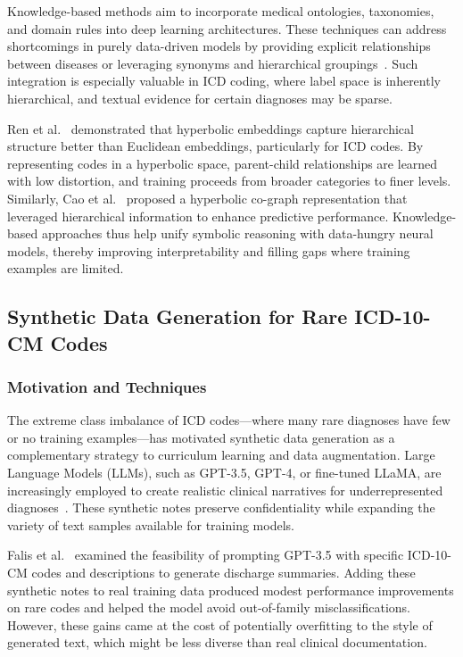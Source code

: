 Knowledge-based methods aim to incorporate medical ontologies, taxonomies, and domain rules into deep learning architectures. These techniques can address shortcomings in purely data-driven models by providing explicit relationships between diseases or leveraging synonyms and hierarchical groupings~\citep{xie2019ehr, teng2020explainable}. Such integration is especially valuable in ICD coding, where label space is inherently hierarchical, and textual evidence for certain diagnoses may be sparse.

Ren et al.~\citep{ren2022hicu} demonstrated that hyperbolic embeddings capture hierarchical structure better than Euclidean embeddings, particularly for ICD codes. By representing codes in a hyperbolic space, parent-child relationships are learned with low distortion, and training proceeds from broader categories to finer levels. Similarly, Cao et al.~\citep{cao2020hypercore} proposed a hyperbolic co-graph representation that leveraged hierarchical information to enhance predictive performance. Knowledge-based approaches thus help unify symbolic reasoning with data-hungry neural models, thereby improving interpretability and filling gaps where training examples are limited.

\subsection{Synthetic Data Generation for Rare ICD-10-CM Codes}\label{sec:p1:synthetic-data}

\subsubsection{Motivation and Techniques}

The extreme class imbalance of ICD codes---where many rare diagnoses have few or no training examples---has motivated synthetic data generation as a complementary strategy to curriculum learning and data augmentation. Large Language Models (LLMs), such as GPT-3.5, GPT-4, or fine-tuned LLaMA, are increasingly employed to create realistic clinical narratives for underrepresented diagnoses~\citep{kumichev2024medsyn, falis2024gpt35}. These synthetic notes preserve confidentiality while expanding the variety of text samples available for training models.

Falis et al.~\citep{falis2024gpt35} examined the feasibility of prompting GPT-3.5 with specific ICD-10-CM codes and descriptions to generate discharge summaries. Adding these synthetic notes to real training data produced modest performance improvements on rare codes and helped the model avoid out-of-family misclassifications. However, these gains came at the cost of potentially overfitting to the style of generated text, which might be less diverse than real clinical documentation.

